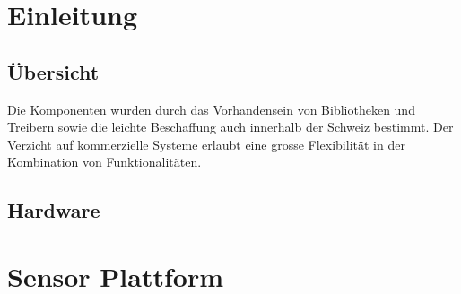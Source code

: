 \documentclass[
  12pt, %
  a4paper, %
  twoside, %
  openany, %
  numbers=noenddot, %
  BCOR=5mm, %
  parskip=half*, %
  thesis, %
]{bfhbook}
\begin{document}
\chapter{Einleitung}
\section{Übersicht}
Die Komponenten wurden durch das Vorhandensein von Bibliotheken und Treibern sowie die leichte Beschaffung auch innerhalb der Schweiz bestimmt. Der Verzicht auf kommerzielle Systeme erlaubt eine grosse Flexibilität in der Kombination von Funktionalitäten.
\section{Hardware}

\chapter{Sensor Plattform}
\end{document}
